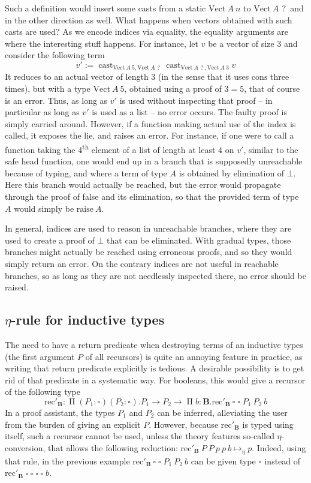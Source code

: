 \documentclass{kaobook}
\renewcommand{\mathtt}{\mathrm}
\newcommand{\uni}[1][]{\square_{#1}}
\newcommand{\red}{\mapsto}
\renewcommand{\P}{\operatorname{\Pi}}
\DeclareMathOperator{\?}{?}
\newcommand{\rec}{\mathtt{rec}}
\newcommand{\bool}{\mathbf{B}}
\newcommand{\ve}{\mathtt{Vect}}
\newcommand{\con}{\mathtt{cons}}
\newcommand{\cas}{\operatorname{\mathtt{cast}}}
\newcommand{\cast}[3]{\cas_{#1,#2}#3}
\newcommand{\rai}{\mathtt{raise}}
\begin{document}
{Such a definition would insert some casts from a static $\ve~A~n$ to $\ve~A~\?$ and in the other direction as well. What happens when vectors obtained with such casts are used? As we encode indices via equality, the equality arguments are where the interesting stuff happens. For instance, let $v$ be a vector of size $3$ and consider the following term
\[v' := \cast{\ve~A~5}{\ve~A~\?}{\cast{\ve~A~\?}{\ve~A~3}{v}}\]
It reduces to an actual vector of length $3$ (in the sense that it uses $\con$ three times), but with a type $\ve~A~5$, obtained using a proof of $3 = 5$, that of course is an error. Thus, as long as $v'$ is used without inspecting that proof – in particular as long as $v'$ is used as a list – no error occurs. The faulty proof is simply carried around. However, if a function making actual use of the index is called, it exposes the lie, and raises an error. For instance, if one were to call a function taking the 4\textsuperscript{th} element of a list of length at least $4$ on $v'$, similar to the safe head function, one would end up in a branch that is supposedly unreachable because of typing, and where a term of type $A$ is obtained by elimination of $\bot$. Here this branch would actually be reached, but the error would propagate through the proof of false and its elimination, so that the provided term of type $A$ would simply be $\rai~A$.

In general, indices are used to reason in unreachable branches, where they are used to create a proof of $\bot$ that can be eliminated. With gradual types, those branches might actually be reached using erroneous proofs, and so they would simply return an error. On the contrary indices are not useful in reachable branches, so as long as they are not needlessly inspected there, no error should be raised.

\subsection{$\eta$-rule for inductive types}

The need to have a return predicate when destroying terms of an inductive types (the first argument $P$ of all recursors) is quite an annoying feature in practice, as writing that return predicate explicitly is tedious. A desirable possibility is to get rid of that predicate in a systematic way. For booleans, this would give a recursor of the following type
\[\rec'_{\bool} : \P (P_1 : \uni) (P_2 : \uni). P_1 \to P_2 \to \P b : \bool. \rec'_{\bool}~\uni~\uni~P_1~P_2~b \]
In a proof assistant, the types $P_1$ and $P_2$ can be inferred, alleviating the user from the burden of giving an explicit $P$. However, because $\rec'_{\bool}$ is typed using itself, such a recursor cannot be used, unless the theory features so-called $\eta$-conversion, that allows the following reduction: $\rec'_{\bool}~P~P~p~p~b \red_\eta p$.
Indeed, using that rule, in the previous example $\rec'_{\bool}~\uni~\uni~P_1~P_2~b$ can be given type $\uni$ instead of $\rec'_{\bool}~\uni~\uni~\uni~\uni~b$.

}
\end{document}
